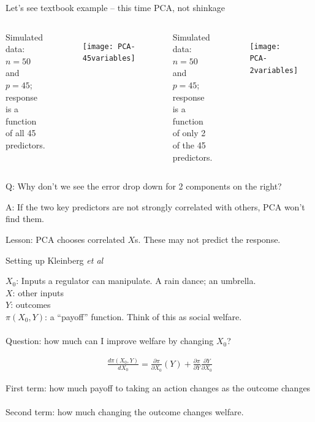 \documentclass[mathserif]{beamer}
\begin{document}
\begin{frame}{Let's see textbook example -- this time PCA, not shinkage}

\begin{columns}
Simulated data: $n=50$ and $p=45$; response is a function of all 45 predictors. 
\begin{figure}
\texttt{[image: PCA-45variables]}
\end{figure}

Simulated data: $n=50$ and $p=45$; response is a function of only 2 of the 45 predictors.  
\begin{figure}
\texttt{[image: PCA-2variables]}
\end{figure}

\end{columns}


Q: Why don't we see the error drop down for 2 components on the right?  

\vspace{2mm}

\pause

A: If the two key predictors are not strongly correlated with others, PCA won't find them.  

\vspace{2mm}

Lesson: PCA chooses correlated $X$s.  These may not predict the response.

\end{frame}



\begin{frame}{Setting up Kleinberg \textit{et al}}

$X_0$: Inputs a regulator can manipulate.  A rain dance; an umbrella.  \\
$X$: other inputs\\
$Y$: outcomes\\
$\pi(X_0,Y)$: a ``payoff'' function.  Think of this as social welfare.\\~\\

Question: how much can I improve welfare by changing $X_0$?

\begin{align*}
\frac{d\pi(X_0,Y)}{d X_0} = \frac{\partial \pi}{\partial X_0}(Y) + \frac{\partial \pi}{\partial Y}\frac{\partial Y}{\partial X_0}  
\end{align*}

\pause
First term: how much payoff to taking an action changes as the outcome changes\\~\\

\pause
Second term: how much changing the outcome changes welfare. 

\end{frame}
\end{document}
